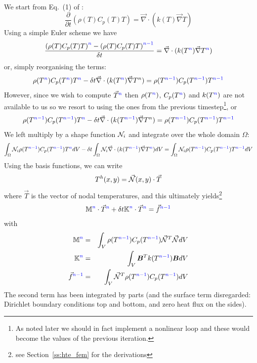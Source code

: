 We start from Eq.~(1) of \textcite{mcjp05}:
\[
\frac{\partial}{\partial t}
\left(\rho(T) C_p(T) T \right) = \vec\nabla \cdot \left(k(T) \vec\nabla T \right)
\]
Using a simple Euler scheme we have
\[
\frac{ \left(\rho(T) C_p(T) T \right)^{\color{blue}n} - \left(\rho(T) C_p(T) T \right)^{\color{blue}n-1} }
{\delta t}   = \vec\nabla \cdot (k(T^{\color{blue}n}) \vec\nabla T^{\color{blue}n})
\]
or, simply reorganising the terms: 
\[
\rho(T^{\color{blue}n}) C_p(T^{\color{blue}n}) T^{{\color{blue}n}} - \delta t \vec\nabla \cdot (k(T^{\color{blue}n}) \vec\nabla T^n)
= \rho(T^{\color{blue}n-1}) C_p(T^{\color{blue}n-1}) T^{\color{blue}n-1} 
\]
However, since we wish to compute $\vec{T}^{\color{blue} n}$ then 
$\rho(T^{\color{blue}n})$, $C_p(T^{\color{blue}n})$ and $k(T^{\color{blue}n})$ are
not available to us so we resort to using the ones from the previous timestep\footnote{As noted
later we should in fact implement a nonlinear loop and these would become the values 
of the previous iteration.}, or
\[
\rho(T^{\color{blue}n-1}) C_p(T^{\color{blue}n-1}) T^{{\color{blue}n}} - \delta t \vec\nabla \cdot (k(T^{\color{blue}n-1}) \vec\nabla T^n)
= \rho(T^{\color{blue}n-1}) C_p(T^{\color{blue}n-1}) T^{\color{blue}n-1} 
\]
We left multiply by a shape function ${\mathcal{N}}_i$ and integrate over the whole domain $\Omega$:
\[
\int_\Omega {\mathcal{N}}_i \rho(T^{\color{blue}n-1}) C_p(T^{\color{blue}n-1}) T^{{\color{blue}n}} dV-
\delta t \int_\Omega {\mathcal{N}}_i \vec\nabla \cdot (k(T^{\color{blue}n-1}) \vec\nabla T^{\color{blue}n}) dV
= 
\int_\Omega {\mathcal{N}}_i\rho(T^{\color{blue} n-1}) C_p(T^{\color{blue}n-1}) T^{\color{blue} n-1} dV
\]
Using the basis functions, we can write
\[
T^h(x,y) = \vec{{\mathcal{N}}}(x,y) \cdot \vec{T}
\]
where $\vec{T}$ is the vector of nodal temperatures, and this ultimately yields\footnote{see Section~\ref{ss:hte_fem}
for the derivations}
\[
{\bm {{\mathbb{M}}}}^{\color{blue}n} \cdot \vec{T}^{\color{blue}n} 
+ \delta t {\bm {{\mathbb{K}}}}^{\color{blue}n} \cdot \vec{T}^{\color{blue}n} = \vec{f}^{\color{blue} n-1}
\]
with
\begin{eqnarray}
{\bm {{\mathbb{M}}}}^{\color{blue}n} &=& \int_V \rho(T^{\color{blue}n-1}) C_p(T^{\color{blue}n-1}) \vec{{\mathcal{N}}}^T \vec{{\mathcal{N}}} dV  \nonumber\\
{\bm {{\mathbb{K}}}}^{\color{blue}n} &=& \int_V {\bm B}^T k(T^{\color{blue}n-1}) {\bm B} dV \nonumber\\
\vec{f}^{\color{blue} n-1} &=& \int_V \vec{{\mathcal{N}}}^T \rho(T^{\color{blue} n-1}) C_p(T^{\color{blue}n-1}) dV \nonumber
\end{eqnarray}
The second term has been integrated by parts (and the surface term disregarded:
Dirichlet boundary conditions top and bottom, and zero heat flux on the sides).

